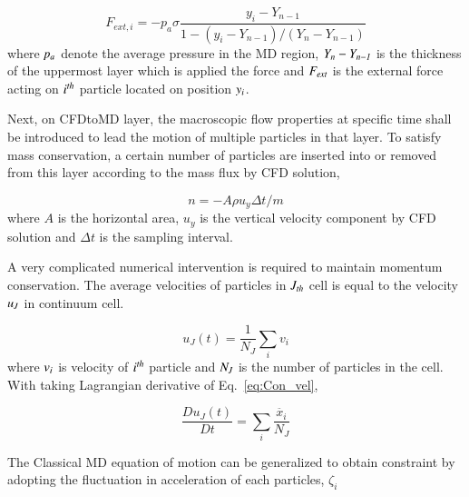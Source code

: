\documentclass[preprint,12pt]{elsarticle}
\begin{document}
\vspace{-.2em}
\begin{equation}
 F_{ext, i} = -p_{a}\sigma\frac{y_{i}-Y_{n-1}}{1-(y_{i}-Y_{n-1})/(Y_{n}-Y_{n-1})}
 \label{eq:External_Force}
\end{equation}
\normalsize
where $\it p_{a}$ denote the average pressure in the MD region, $\it Y_{n}-Y_{n-1}$ is the thickness of the uppermost layer which is applied the force and $\it F_{ext}$ is the external force acting on $\it i^{th}$ particle located on position $\it y_{i}$.


Next, on CFDtoMD layer, the macroscopic flow properties at specific time shall be introduced to lead the motion of multiple particles in that layer. To satisfy mass conservation, a certain number of particles are inserted into or removed from this layer according to the mass flux by CFD solution,

\vspace{-.2em}
\begin{equation}
n = -A \rho u_y \Delta t / m
 \label{eq:Mass_Flux}
\end{equation}
\normalsize
where $A$ is the horizontal area, $u_y$ is the vertical velocity component by CFD solution and $\Delta t$ is the sampling interval.

A very complicated numerical intervention is required to maintain momentum conservation. The average velocities of particles in $\it J_{th}$ cell is equal to the velocity $\it u_{J}$ in continuum cell.

\vspace{-.2em}
\begin{equation}
 u_{J}(t) = \frac{1}{N_{J}} \displaystyle\sum_{i} v_{i}
 \label{eq:Con_vel}
\end{equation}
\normalsize
where $\it v_{i}$ is velocity of $\it i^{th}$ particle and $\it N_{J}$ is the number of particles in the cell. With taking Lagrangian derivative of Eq.~\ref{eq:Con_vel},

\vspace{-.2em}
\begin{equation}
 \frac{Du_{J}(t)}{Dt} =  \displaystyle\sum_{i} \frac{\ddot{x_{i}}}{N_{J}}
 \label{eq:Lagrangian}
\end{equation}
\normalsize

The Classical MD equation of motion can be generalized to obtain constraint by adopting the fluctuation in acceleration of each particles, $\zeta_{i}$
\end{document}
